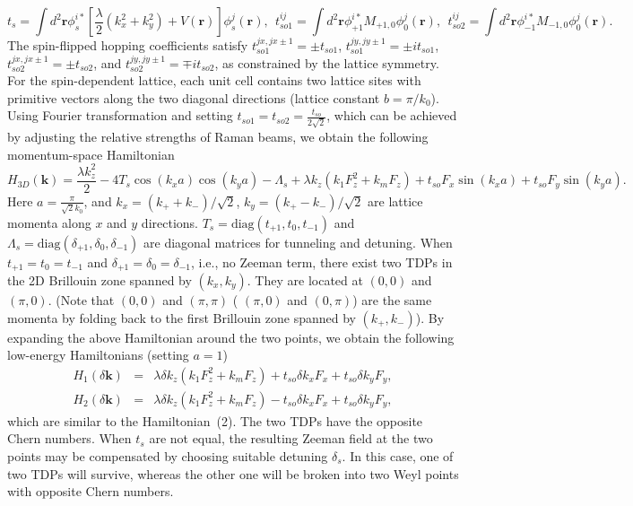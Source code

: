 \documentclass[aps,prl,floatfix,twocolumn,reprint]{revtex4}
\begin{document}
\begin{equation}
t_{s}=\int d^{2}\bm{r}\phi _{s}^{i\ast }\left[ \frac{\lambda }{2}%
(k_{x}^{2}+k_{y}^{2})+V(\bm{r})\right] \phi _{s}^{j}(\bm{r}%
),~~t_{so1}^{ij}=\int d^{2}\bm{r}\phi _{+1}^{i\ast }M_{+1,0}\phi _{0}^{j}(%
\bm{r}),~~t_{so2}^{ij}=\int d^{2}\bm{r}\phi _{-1}^{i\ast }M_{-1,0}\phi
_{0}^{j}(\bm{r}).
\end{equation}%
The spin-flipped hopping coefficients satisfy $t_{so1}^{jx,jx\pm 1}=\pm
t_{so1}$, $t_{so1}^{jy,jy\pm 1}=\pm it_{so1}$, $t_{so2}^{jx,jx\pm 1}=\pm
t_{so2}$, and $t_{so2}^{jy,jy\pm 1}=\mp it_{so2}$, as constrained by the
lattice symmetry. For the spin-dependent lattice, each unit cell contains
two lattice sites with primitive vectors along the two diagonal directions
(lattice constant $b=\pi /k_{0}$). Using Fourier transformation and setting $%
t_{so1}=t_{so2}=\frac{t_{so}}{2\sqrt{2}}$, which can be achieved by
adjusting the relative strengths of Raman beams, we obtain the following
momentum-space Hamiltonian
\begin{equation}
H_{3D}(\bm{k})=\frac{\lambda k_{z}^{2}}{2}-4T_{s}\cos (k_{x}a)\cos
(k_{y}a)-\Lambda _{s}+\lambda
k_{z}(k_{1}F_{z}^{2}+k_{m}F_{z})+t_{so}F_{x}\sin (k_{x}a)+t_{so}F_{y}\sin
(k_{y}a).
\end{equation}%
Here $a=\frac{\pi }{\sqrt{2}k_{0}}$, and $k_{x}=(k_{+}+k_{-})/\sqrt{2}$, $%
k_{y}=(k_{+}-k_{-})/\sqrt{2}$ are lattice momenta along $x$ and $y$
directions. $T_{s}=\mbox{diag}\left( t_{+1},t_{0},t_{-1}\right) $ and $%
\Lambda _{s}=\mbox{diag}\left( \delta _{+1},\delta _{0},\delta _{-1}\right) $
are diagonal matrices for tunneling and detuning. When $t_{+1}=t_{0}=t_{-1}$
and $\delta _{+1}=\delta _{0}=\delta _{-1}$, i.e., no Zeeman term, there
exist two TDPs in the 2D Brillouin zone spanned by $(k_{x},k_{y})$. They are
located at $(0,0)$ and $(\pi ,0)$. (Note that $(0,0)$ and $(\pi ,\pi )$ ( $%
(\pi ,0)$ and $(0,\pi )$) are the same momenta by folding back to the first 
Brillouin zone spanned by $(k_{+},k_{-})$). By expanding the above
Hamiltonian around the two points, we obtain the following low-energy
Hamiltonians (setting $a=1$)
\begin{eqnarray}
H_{1}(\delta \bm{k}) &=&\lambda \delta
k_{z}(k_{1}F_{z}^{2}+k_{m}F_{z})+t_{so}\delta k_{x}F_{x}+t_{so}\delta
k_{y}F_{y}, \\
H_{2}(\delta \bm{k}) &=&\lambda \delta
k_{z}(k_{1}F_{z}^{2}+k_{m}F_{z})-t_{so}\delta k_{x}F_{x}+t_{so}\delta
k_{y}F_{y},  \label{hamlowenergy}
\end{eqnarray}%
which are similar to the Hamiltonian~(2). The two TDPs have the opposite
Chern numbers. When $t_{s}$ are not equal, the resulting Zeeman field at the
two points may be compensated by choosing suitable detuning $\delta _{s}$.
In this case, one of two TDPs will survive, whereas the other one will be
broken into two Weyl points with opposite Chern numbers.
\end{document}
